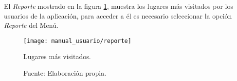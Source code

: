 El \emph{Reporte} mostrado en la figura \ref{fig:vista_reporte}, muestra los lugares más visitados por los usuarios de la aplicación, para acceder a él es necesario seleccionar la opción \emph{Reporte} del Menú.

\begin{figure}[H]
      \begin{center}
        \texttt{[image: manual\_usuario/reporte]}

        \caption{Lugares más visitados.}
        \label{fig:vista_reporte}
        \caption*{Fuente: Elaboración propia.}
      \end{center}
\end{figure}
